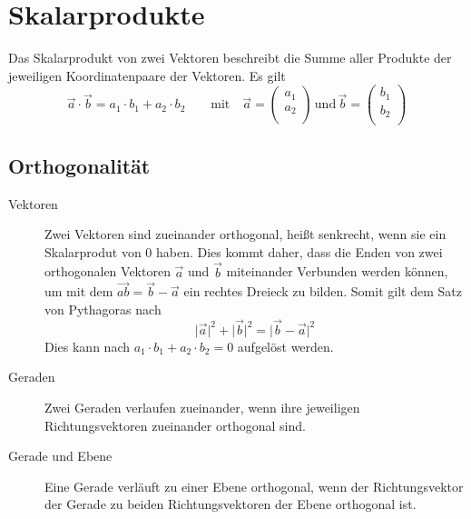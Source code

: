 \documentclass{article}
\begin{document}
  
\newcommand{\norm}[1]{\big| {#1} \big|}  
\newcommand{\vect}[1]{\overrightarrow{#1}} 
 
\section{Skalarprodukte}
Das Skalarprodukt von zwei Vektoren beschreibt die Summe aller Produkte der jeweiligen Koordinatenpaare der Vektoren. Es gilt
\[
 \vect{a} \cdot \vect{b} =
 a_1 \cdot b_1 + a_2 \cdot b_2 \qquad
 \text{mit} \quad
 \vect{a} = 
 \begin{pmatrix}
  a_1 \\
  a_2 \\
 \end{pmatrix}
 \, \text{und} \, 
 \vect{b} = 
 \begin{pmatrix}
  b_1 \\
  b_2 \\
 \end{pmatrix}
\]
 
\subsection{Orthogonalität}
\begin{description} 
 \item[Vektoren] Zwei Vektoren sind zueinander orthogonal, heißt senkrecht, wenn sie ein Skalarprodut von $0$ haben. \newline
 Dies kommt daher, dass die Enden von zwei orthogonalen Vektoren $\vect{a}$ und $\vect{b}$ miteinander Verbunden werden können, um mit dem $\vect{ab} = \vect{b} - \vect{a}$ ein rechtes Dreieck zu bilden. Somit gilt dem Satz von Pythagoras nach  
 \[  
  \norm{\vect{a}}^2 + \norm{\vect{b}}^2 = \norm{\vect{b} - \vect{a}}^2
 \]
 Dies kann nach $a_1 \cdot b_1 + a_2 \cdot b_2 = 0$ aufgelöst werden. %
 \item[Geraden] Zwei Geraden verlaufen zueinander, wenn ihre jeweiligen Richtungsvektoren zueinander orthogonal sind. %
 \item[Gerade und Ebene] Eine Gerade verläuft zu einer Ebene orthogonal, wenn der Richtungsvektor der Gerade zu beiden Richtungsvektoren der Ebene orthogonal ist.  
\end{description}
 
\end{document}
